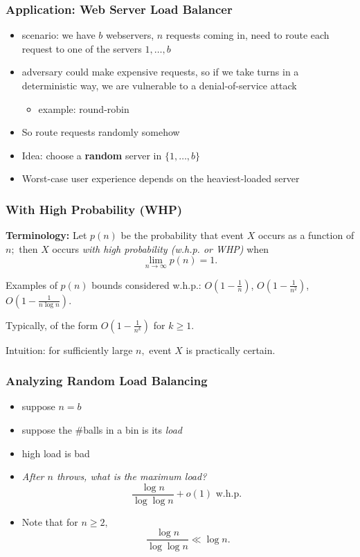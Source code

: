 \documentclass[10pt]{beamer}
\begin{document}
\begin{frame} \frametitle{Application: Web Server Load Balancer}
  \begin{itemize}
    \item scenario: we have $b$ webservers, $n$ requests coming in, need to route
      each request to one of the servers $1, \ldots, b$
    \item adversary could make expensive requests, so if we take turns in a deterministic
      way, we are vulnerable to a denial-of-service attack
      \begin{itemize}
        \item example: round-robin
      \end{itemize}
    \item So route requests randomly somehow
    \item Idea: choose a \textbf{random} server in $\{1, \ldots, b\}$
    \item Worst-case user experience depends on the heaviest-loaded server
  \end{itemize}
\end{frame}

\begin{frame} \frametitle{With High Probability (WHP)}

\textbf{Terminology:} Let $p(n)$ be the probability that event $X$ occurs as a function of $n;$
then $X$ occurs \emph{with high probability (w.h.p. or WHP)} when
\[ \lim_{n \rightarrow \infty} p(n) = 1. \]

Examples of $p(n)$ bounds considered w.h.p.: $O(1-\frac{1}{n})$, $O(1-\frac{1}{n^2})$, $O(1-\frac{1}{n \log n}).$
\vspace{12pt}

Typically, of the form $O(1-\frac{1}{n^k})$ for $k \geq 1.$
\vspace{12pt}

Intuition: for sufficiently large $n,$ event $X$ is practically certain.
\end{frame}

\begin{frame} \frametitle{Analyzing Random Load Balancing}
\begin{itemize}
  \item suppose $n=b$
  \item suppose the \#balls in a bin is its \emph{load}
  \item high load is bad
  \item \emph{After $n$ throws, what is the maximum load?}
    \[ \frac{\log n}{\log \log n} + o(1) \text{ w.h.p. } \]
  \item Note that for $n \geq 2,$
    \[ \frac{\log n}{\log \log n} \ll \log n . \]
\end{itemize}
\end{frame}
\end{document}
